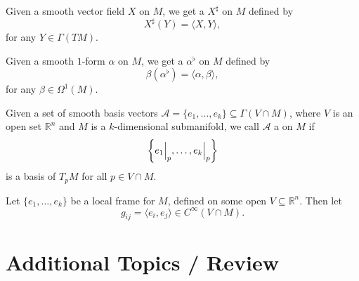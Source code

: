 \documentclass[notoc,notitlepage]{tufte-book}
\begin{document}
\begin{defn}\label{defn:metric_dual_1_form}
  Given a smooth vector field $X$ on $M$, we get a  $X^\sharp$ on $M$ defined by
  \begin{equation*}
    X^\sharp(Y) = \langle X, Y \rangle,
  \end{equation*}
  for any $Y \in \Gamma(TM)$.
\end{defn}

\begin{defn}\label{defn:metric_dual_vector_field}
  Given a smooth $1$-form $\alpha$ on $M$, we get a  $\alpha^\flat$ on $M$ defined by
  \begin{equation*}
    \beta(\alpha^\flat) = \langle \alpha, \beta \rangle,
  \end{equation*}
  for any $\beta \in \Omega^1(M)$.
\end{defn}

\begin{defn}\label{defn:local_frame}
  Given a set of smooth basis vectors $\mathcal{A} = \{ e_1, \ldots, e_k \}
  \subseteq \Gamma(V \cap M)$, where $V$ is an open set $\mathbb{R}^n$ and $M$ 
  is a $k$-dimensional submanifold, we call $\mathcal{A}$ a  on $M$ if
  \begin{equation*}
    \left\{ e_1 \Big|_{p}^{}, \ldots, e_k \Big|_{p}^{} \right\}
  \end{equation*}
  is a basis of $T_p M$ for all $p \in V \cap M$.
\end{defn}

Let $\{ e_1, \ldots, e_k \}$ be a local frame for $M$, defined on some open $V
\subseteq \mathbb{R}^n$. Then let
\begin{equation*}
  g_{ij} = \langle e_i, e_j \rangle \in C^\infty(V \cap M).
\end{equation*}




\appendix

\chapter{Additional Topics / Review}%
\label{chp:additional_topics_review}
\end{document}
